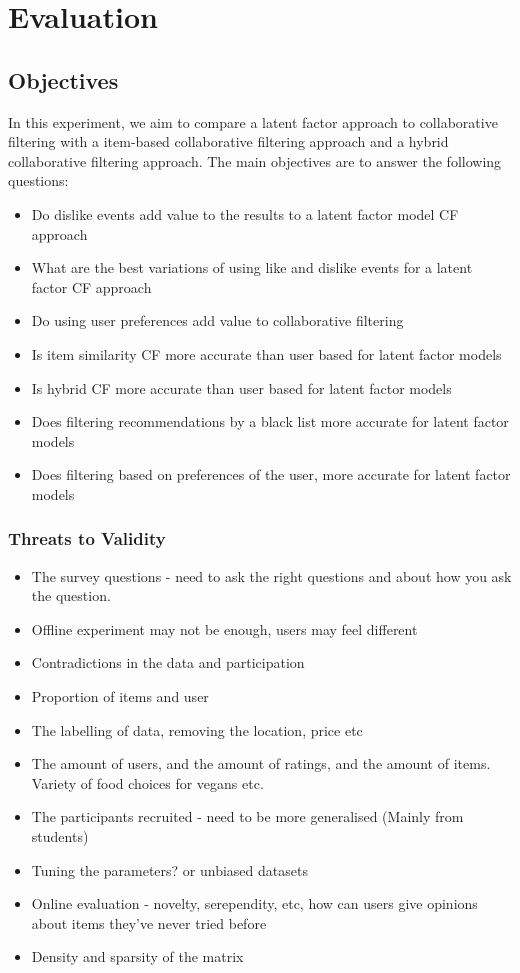 \chapter{Evaluation}\label{C:evaluation}

\section{Objectives}

In this experiment, we aim to compare a latent factor approach to collaborative filtering with a item-based collaborative filtering approach and a hybrid collaborative filtering approach. The main objectives are to answer the following questions:
\begin{itemize}
	\item{Do dislike events add value to the results to a latent factor model CF approach}
	\item{What are the best variations of using like and dislike events for a latent factor CF approach}
	\item{Do using user preferences add value to collaborative filtering}
	\item{Is item similarity CF more accurate than user based for latent factor models}
	\item{Is hybrid CF more accurate than user based for latent factor models}
	\item{Does filtering recommendations by a black list more accurate for latent factor models}
	\item{Does filtering based on preferences of the user, more accurate for latent factor models}
\end{itemize}

\subsection{Threats to Validity}
\begin{itemize}
	\item{The survey questions - need to ask the right questions and about how you ask the question.}
	\item{Offline experiment may not be enough, users may feel different}
	\item{Contradictions in the data and participation}
	\item{Proportion of items and user}
	\item{The labelling of data, removing the location, price etc}
	\item{The amount of users, and the amount of ratings, and the amount of items. Variety of food choices for vegans etc. }
	\item{The participants recruited - need to be more generalised (Mainly from students)}
	\item{Tuning the parameters? or unbiased datasets}
	\item{Online evaluation - novelty, serependity, etc, how can users give opinions about items they've never tried before}
	\item{Density and sparsity of the matrix}
\end{itemize}


